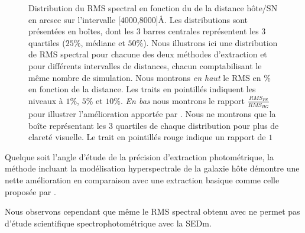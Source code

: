 \documentclass[../main/main.tex]{subfiles}
\begin{document}
\begin{figure}[ht]
  \centering
  \caption[Distribution du RMS spectral en fonction de la distance
  hôte/SN.]{Distribution du RMS spectral en fonction du de la distance
    hôte/SN en arcsec sur l'intervalle [$4000$,$8000$]\AA. Les
    distributions sont présentées en boîtes, dont les 3 barres
    centrales représentent les 3 quartiles ($25\%$, médiane et $50\%$). Nous illustrons ici une
    distribution de RMS spectral pour chacune des deux méthodes
    d'extraction et pour différents intervalles de distances, chacun comptabilisant le
    même nombre de simulation. Nous montrons \emph{en haut} le RMS en $\%$
    en fonction de la distance. Les traits en pointillés indiquent les niveaux à
    $1\%$, $5\%$ et $10\%$. \emph{En bas} nous montrons le rapport
    $\frac{RMS_{PS}}{RMS_{HG}}$ pour illustrer l'amélioration apportée par
    \hypergal. Nous ne montrons que la boîte représentant les 3 quartiles de
    chaque distribution pour plus de clareté visuelle. Le trait en
    pointillés rouge indique un rapport de $1$}
  \label{fig:simu_rms_dist_spectrophoto}
\end{figure}

Quelque soit l'angle d'étude de la précision d'extraction photométrique,
la méthode incluant la modélisation hyperspectrale de la galaxie hôte
démontre une nette amélioration en comparaison avec une extraction
basique comme celle proposée par \pysedm.

Nous observons cependant que même le RMS spectral obtenu avec \hypergal
ne permet pas d'étude scientifique
spectrophotométrique avec la SEDm.
\end{document}
